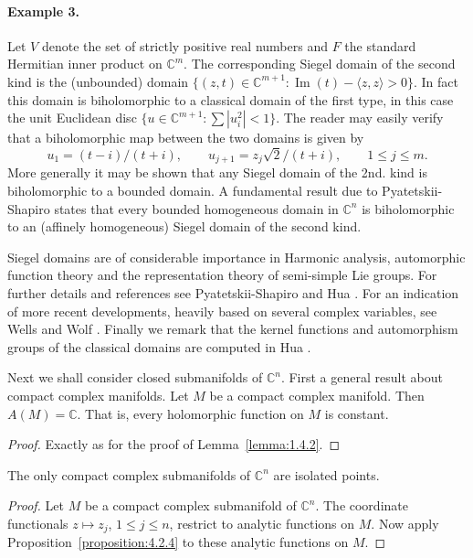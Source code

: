 \paragraph*{Example 3.} Let $V$ denote the set of strictly positive real numbers and $F$ the standard Hermitian inner product on $\mathbb C^m$. The corresponding Siegel domain of the second kind is the (unbounded) domain $\{(z,t)\in\mathbb C^{m+1}:\operatorname{Im}(t)-\langle z,z\rangle>0\}$. In fact this domain is biholomorphic to a classical domain of the first type, in this case the unit Euclidean disc $\{u\in\mathbb C^{m+1}:\sum|u_i^2|<1\}$. The reader may easily verify that a biholomorphic map between the two domains is given by
\[
u_1=(t-i)/(t+i),\qquad u_{j+1}=z_j\sqrt2/(t+i),\qquad1\leq j\leq m.
\]
More generally it may be shown that any Siegel domain of the 2nd. kind is biholomorphic to a bounded domain. A fundamental result due to Pyatetskii-Shapiro \cite{bib:I:pyatetskii-shapiro-i-i:1} states that every bounded homogeneous domain in $\mathbb C^n$ is biholomorphic to an (affinely homogeneous) Siegel domain of the second kind.

Siegel domains are of considerable importance in Harmonic analysis, automorphic function theory and the representation theory of semi-simple Lie groups. For further details and references see Pyatetskii-Shapiro \cite{bib:I:pyatetskii-shapiro-i-i:1} and Hua \cite{bib:I:hua-l-k:1}. For an indication of more recent developments, heavily based on several complex variables, see Wells and Wolf \cite{bib:I:wells-r-o-and-wolf-j-a:1}. Finally we remark that the kernel functions and automorphism groups of the classical domains are computed in Hua \cite{bib:I:hua-l-k:1}.

Next we shall consider closed submanifolds of $\mathbb C^n$. First a general result about compact complex manifolds.
 Let $M$ be a compact complex manifold. Then $A(M)=\mathbb C$. That is, every holomorphic function on $M$ is constant.
\begin{proof}
Exactly as for the proof of Lemma~\ref{lemma:1.4.2}.
\end{proof}

 The only compact complex submanifolds of $\mathbb C^n$ are isolated points.
\begin{proof}
Let $M$ be a compact complex submanifold of $\mathbb C^n$. The coordinate functionals $z\longmapsto z_j$, $1\leq j\leq n$, restrict to analytic functions on $M$. Now apply Proposition~\ref{proposition:4.2.4} to these analytic functions on $M$.
\end{proof}

